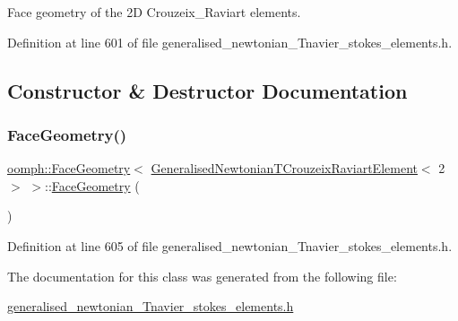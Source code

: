 Face geometry of the 2D Crouzeix\+\_\+\+Raviart elements. 

Definition at line 601 of file generalised\+\_\+newtonian\+\_\+\+Tnavier\+\_\+stokes\+\_\+elements.\+h.



\subsection{Constructor \& Destructor Documentation}
\mbox{\label{classoomph_1_1FaceGeometry_3_01GeneralisedNewtonianTCrouzeixRaviartElement_3_012_01_4_01_4_a44c830ef6f00f6c104cac57f7751f343}} 
\subsubsection{\texorpdfstring{Face\+Geometry()}{FaceGeometry()}}
{\footnotesize\ttfamily \hyperlink{classoomph_1_1FaceGeometry}{oomph\+::\+Face\+Geometry}$<$ \hyperlink{classoomph_1_1GeneralisedNewtonianTCrouzeixRaviartElement}{Generalised\+Newtonian\+T\+Crouzeix\+Raviart\+Element}$<$ 2 $>$ $>$\+::\hyperlink{classoomph_1_1FaceGeometry}{Face\+Geometry} (\begin{DoxyParamCaption}{ }\end{DoxyParamCaption})\hspace{0.3cm}{\ttfamily [inline]}}



Definition at line 605 of file generalised\+\_\+newtonian\+\_\+\+Tnavier\+\_\+stokes\+\_\+elements.\+h.



The documentation for this class was generated from the following file\+:\begin{DoxyCompactItemize}
\item 
\hyperlink{generalised__newtonian__Tnavier__stokes__elements_8h}{generalised\+\_\+newtonian\+\_\+\+Tnavier\+\_\+stokes\+\_\+elements.\+h}\end{DoxyCompactItemize}
